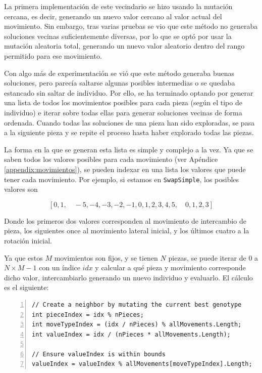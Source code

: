 \documentclass[11pt,spanish,listoffigures,listoftables]{tfgetsinf}
\begin{document}
La primera implementación de este vecindario se hizo usando la mutación cercana, es decir, generando un nuevo valor cercano al valor actual del movimiento. Sin embargo, tras varias pruebas se vio que este método no generaba soluciones vecinas suficientemente diversas, por lo que se optó por usar la mutación aleatoria total, generando un nuevo valor aleatorio dentro del rango permitido para ese movimiento.

Con algo más de experimentación se vió que este método generaba buenas soluciones, pero parecía saltarse algunas posibles intermedias o se quedaba estancado sin saltar de individuo. Por ello, se ha terminado optando por generar una lista de todos los movimientos posibles para cada pieza (según el tipo de individuo) e iterar sobre todas ellas para generar soluciones vecinas de forma ordenada. Cuando todas las soluciones de una pieza han sido exploradas, se pasa a la siguiente pieza y se repite el proceso hasta haber explorado todas las piezas.

La forma en la que se generan esta lista es simple y complejo a la vez. Ya que se saben todos los valores posibles para cada movimiento (ver Apéndice \ref{appendix:movimientos}), se pueden indexar en una lista los valores que puede tener cada movimiento. Por ejemplo, si estamos en \texttt{SwapSimple}, los posibles valores son 

$$
[0, 1, \quad -5, -4, -3, -2, -1, 0, 1, 2, 3, 4, 5, \quad 0, 1, 2, 3]
$$

Donde los primeros dos valores corresponden al movimiento de intercambio de pieza, los siguientes once al movimiento lateral inicial, y los últimos cuatro a la rotación inicial.

Ya que estos $M$ movimientos son fijos, y se tienen $N$ piezas, se puede iterar de $0$ a $N\times M - 1$ con un índice $idx$ y calcular a qué pieza y movimiento corresponde dicho valor, intercambiarlo generando un nuevo individuo y evaluarlo. El cálculo es el siguiente:

\begin{lstlisting}[language={[Sharp]C}, basicstyle=\ttfamily\small, frame=single, numbers=left, breaklines=true]
// Create a neighbor by mutating the current best genotype
int pieceIndex = idx % nPieces;
int moveTypeIndex = (idx / nPieces) % allMovements.Length;
int valueIndex = idx / (nPieces * allMovements.Length);

// Ensure valueIndex is within bounds
valueIndex = valueIndex % allMovements[moveTypeIndex].Length;
\end{lstlisting}
\end{document}
